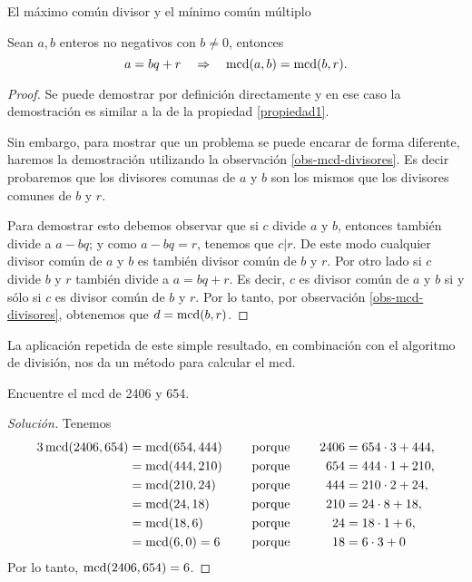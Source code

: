 \begin{section}{El máximo común divisor y el mínimo común múltiplo}
\begin{proposicion}\label{prop-alg-eucl} Sean  $a,b$ enteros no negativos con $b \not=0$, entonces 
    \begin{equation}\label{bec}
    a=bq+r\quad \Rightarrow \quad\operatorname{mcd}(a,b)=\operatorname{mcd}(b,r).
    \end{equation}
\end{proposicion}
\begin{proof}
    Se puede demostrar por definición directamente y en ese caso la demostración es similar a la de la propiedad \ref{propiedad1}. 
    
    Sin embargo, para mostrar que un problema se puede encarar de forma diferente, haremos la demostración utilizando la observación \ref{obs-mcd-divisores}. Es decir probaremos que los divisores comunas de $a$ y $b$ son los mismos que los divisores comunes de $b$ y $r$. 

    Para demostrar esto debemos observar que si $c$ divide $a$ y $b$, entonces también divide a $a-bq$; y como $a-bq=r$, tenemos que $c|r$. De este modo cualquier divisor común de $a$ y $b$ es también divisor común de $b$ y $r$.  Por otro lado si $c$ divide $b$ y $r$ también divide a $a=bq+r$. Es decir, $c$ es divisor común de $a$ y $b$ si y sólo si $c$ es divisor común de $b$ y $r$. Por lo tanto, por observación \ref{obs-mcd-divisores}, obtenemos que $d = \operatorname{mcd}(b,r)$.
\end{proof}

La aplicación repetida de este simple resultado, en combinación con el algoritmo de división, nos da un método para calcular el mcd.

\begin{ejemplo*} Encuentre el mcd de 2406 y 654.
\end{ejemplo*}
\begin{proof}[Solución] Tenemos
    \begin{alignat*}3
    \mcd(2406,654)&=\mcd(654,444)&\quad &\text{ porque }\quad& 2406&=654\cdot3+444,\\
    &=\mcd(444,210)& &\text{ porque }\quad& 654&=444\cdot1+210,\\
    &=\mcd(210,24)&& \text{ porque }\quad &444&=210\cdot2+24,\\
    &=\mcd(24,18) && \text{ porque }\quad &210&=24\cdot8+18,\\
    &=\mcd(18,6)  && \text{ porque }\quad &24 &=18\cdot1+6,\\
    & =\mcd(6,0) = 6           &&\text{ porque }\quad&18&=6\cdot3 + 0
    \end{alignat*}
    Por lo tanto, $\operatorname{mcd}(2406,654) = 6$.
\end{proof}


\end{section}
